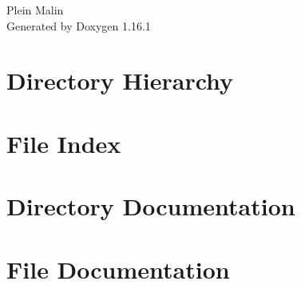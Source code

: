 \documentclass[twoside]{book}
\newcommand{\+}{\discretionary{\mbox{\scriptsize$\hookleftarrow$}}{}{}}
\newcommand{\clearemptydoublepage}{%
    \newpage{\pagestyle{empty}\cleardoublepage}%
  }
\begin{document}
  \raggedbottom
    \hypersetup{pageanchor=false,
                bookmarksnumbered=true,
                pdfencoding=unicode
               }
  \begin{titlepage}
  \vspace*{7cm}
  \begin{center}%
  {\Large Plein Malin}\\
  \vspace*{1cm}
  {\large Generated by Doxygen 1.16.1}\\
  \end{center}
  \end{titlepage}
  \clearemptydoublepage
  \tableofcontents
  \clearemptydoublepage
  \hypersetup{pageanchor=true}
\chapter{Directory Hierarchy}

\chapter{File Index}

\chapter{Directory Documentation}

\chapter{File Documentation}













  \backmatter
  \newpage
  \clearemptydoublepage
  \printindex
\end{document}
